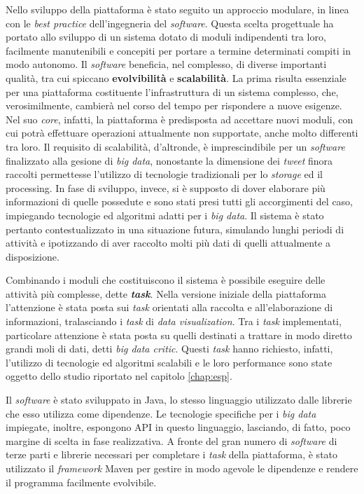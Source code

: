 Nello sviluppo della piattaforma è stato seguito un approccio modulare, in linea con le \textit{best practice} dell’ingegneria del \textit{software}. Questa scelta progettuale ha portato allo 
sviluppo di un sistema dotato di moduli indipendenti tra loro, facilmente manutenibili e concepiti per portare a termine determinati compiti in modo autonomo. Il \textit{software} 
beneficia, nel complesso, di diverse importanti qualità, tra cui spiccano \textbf{evolvibilità} e \textbf{scalabilità}. La prima risulta essenziale per una piattaforma costituente l’infrastruttura 
di un sistema complesso, che, verosimilmente, cambierà nel corso del tempo per rispondere a nuove esigenze. Nel suo \textit{core}, infatti, la piattaforma è predisposta ad accettare nuovi 
moduli, con cui potrà effettuare operazioni attualmente non supportate, anche molto differenti tra loro. Il requisito di scalabilità, d’altronde, è imprescindibile per un \textit{software}
finalizzato alla gesione di \textit{big data}, nonostante la dimensione dei \textit{tweet} finora raccolti permettesse l’utilizzo di tecnologie tradizionali per lo \textit{storage} ed il processing. In fase di sviluppo, invece, 
si è supposto di dover elaborare più informazioni di quelle possedute e sono stati presi tutti gli accorgimenti del caso, impiegando tecnologie ed algoritmi adatti per i \textit{big data}. 
Il sistema è stato pertanto contestualizzato in una situazione futura, simulando lunghi periodi di attività e ipotizzando di aver raccolto molti più dati di quelli attualmente a 
disposizione.

Combinando i moduli che costituiscono il sistema è possibile eseguire delle attività più complesse, dette \textbf{\textit{task}}. Nella versione iniziale della piattaforma l’attenzione è stata posta 
sui \textit{task} orientati alla raccolta e all’elaborazione di informazioni, tralasciando i \textit{task} di \textit{data visualization}. Tra i \textit{task} implementati, particolare attenzione è stata posta su quelli 
destinati a trattare in modo diretto grandi moli di dati, detti \textit{big data critic}. Questi \textit{task} hanno richiesto, infatti, l’utilizzo di tecnologie ed algoritmi scalabili e le loro 
performance sono state oggetto dello studio riportato nel capitolo \ref{chap:esp}.

Il \textit{software} è stato sviluppato in Java, lo stesso linguaggio utilizzato dalle librerie che esso utilizza come dipendenze. Le tecnologie specifiche per i \textit{big data} impiegate, inoltre, 
espongono API in questo linguaggio, lasciando, di fatto, poco margine di scelta in fase realizzativa. A fronte del gran numero di \textit{software} di terze parti e librerie necessari 
per completare i \textit{task} della piattaforma, è stato utilizzato il \textit{framework} Maven per gestire in modo agevole le dipendenze e rendere il programma facilmente evolvibile.


